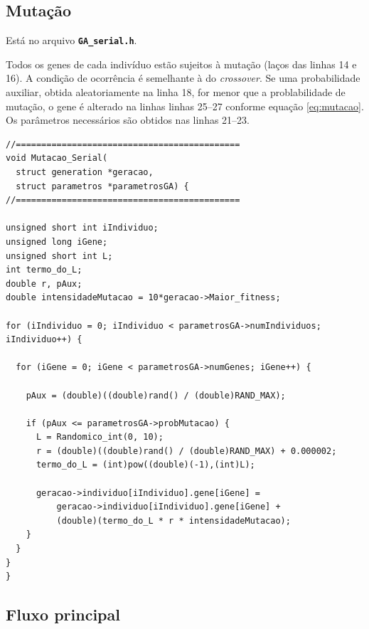 \subsection{Mutação}

	Está no arquivo \textbf{\texttt{GA\_serial.h}}.
	
	Todos os genes de cada indivíduo estão sujeitos à mutação (laços das linhas 14 e 16). A condição de ocorrência é semelhante à do \emph{crossover}. Se uma probabilidade auxiliar, obtida aleatoriamente na linha 18, for menor que a problabilidade de mutação, o gene é alterado na linhas linhas 25--27 conforme equação \ref{eq:mutacao}. Os parâmetros necessários são obtidos nas linhas 21--23.
	
\vspace{1 cm}
\begin{lstlisting}
//============================================
void Mutacao_Serial(
  struct generation *geracao,
  struct parametros *parametrosGA) {
//============================================

unsigned short int iIndividuo;
unsigned long iGene;
unsigned short int L;
int termo_do_L;
double r, pAux;
double intensidadeMutacao = 10*geracao->Maior_fitness;

for (iIndividuo = 0; iIndividuo < parametrosGA->numIndividuos; iIndividuo++) {

  for (iGene = 0; iGene < parametrosGA->numGenes; iGene++) {

    pAux = (double)((double)rand() / (double)RAND_MAX);

    if (pAux <= parametrosGA->probMutacao) {
      L = Randomico_int(0, 10);
      r = (double)((double)rand() / (double)RAND_MAX) + 0.000002;
      termo_do_L = (int)pow((double)(-1),(int)L);
			
      geracao->individuo[iIndividuo].gene[iGene] =
          geracao->individuo[iIndividuo].gene[iGene] +
          (double)(termo_do_L * r * intensidadeMutacao);
    }
  }
}
}
\end{lstlisting}
\vspace{1 cm}


\subsection{Fluxo principal}
	
